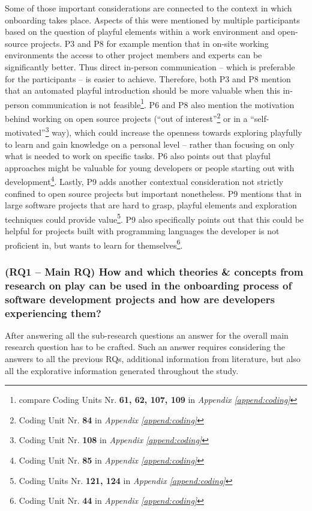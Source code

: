 Some of those important considerations are connected to the context in which onboarding takes place. Aspects of this were mentioned by multiple participants based on the question of playful elements within a work environment and open-source projects. P3 and P8 for example mention that in on-site working environments the access to other project members and experts can be significantly better. Thus direct in-person communication -- which is preferable for the participants -- is easier to achieve. Therefore, both P3 and P8 mention that an automated playful introduction should be more valuable when this in-person communication is not feasible\footnote{compare Coding Units Nr. \textbf{61, 62, 107, 109} in \textit{Appendix \ref{append:coding}}}. P6 and P8 also mention the motivation behind working on open source projects (\enquote{out of interest}\footnote{Coding Unit Nr. \textbf{84} in \textit{Appendix \ref{append:coding}}} or in a \enquote{self-motivated}\footnote{Coding Unit Nr. \textbf{108} in \textit{Appendix \ref{append:coding}}} way), which could increase the openness towards exploring playfully to learn and gain knowledge on a personal level -- rather than focusing on only what is needed to work on specific tasks. P6 also points out that playful approaches might be valuable for young developers or people starting out with development\footnote{Coding Unit Nr. \textbf{85} in \textit{Appendix \ref{append:coding}}}. Lastly, P9 adds another contextual consideration not strictly confined to open source projects but important nonetheless. P9 mentions that in large software projects that are hard to grasp, playful elements and exploration techniques could provide value\footnote{Coding Units Nr. \textbf{121, 124} in \textit{Appendix \ref{append:coding}}}. P9 also specifically points out that this could be helpful for projects built with programming languages the developer is not proficient in, but wants to learn for themselves\footnote{Coding Unit Nr. \textbf{44} in \textit{Appendix \ref{append:coding}}}.

\subsubsection*{(RQ1 -- Main RQ) How and which theories \& concepts from research on play can be used in the onboarding process of software development projects and how are developers experiencing them?}

After answering all the sub-research questions an answer for the overall main research question has to be crafted. Such an answer requires considering the answers to all the previous RQs, additional information from literature, but also all the explorative information generated throughout the study.

